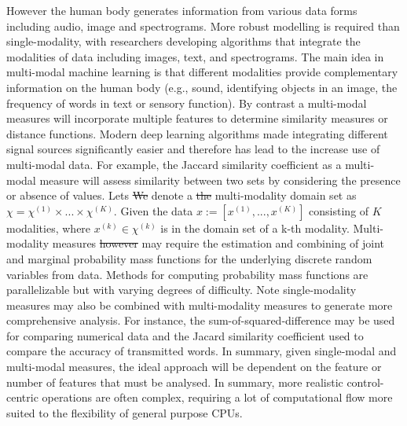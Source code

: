 \documentclass[10pt]{article}[draft]
\begin{document}
However the human body generates information from various data forms including audio, image and spectrograms.  More robust modelling is required than single-modality, with researchers developing algorithms that integrate the modalities of data including images, text, and spectrograms. The main idea in multi-modal machine learning is that different modalities provide complementary information on the human body (e.g., sound, identifying objects in an image, the frequency of words in text or sensory function).  By contrast a multi-modal measures will incorporate multiple  features to determine similarity measures or distance functions. Modern deep learning algorithms made integrating different signal sources significantly easier and therefore has lead to the increase use of multi-modal data.  For example, the Jaccard similarity coefficient as a multi-modal measure will assess similarity between two sets by considering the presence or absence of  values. Lets \st{We} denote a \st{the} multi-modality domain set as $\chi =  \chi^{(1)} \times ... \times \chi^{(K)} $. Given the data $x := [x^{(1)}, ... , x^{(K)}]$ consisting of $K$ modalities, where $x^{(k)}  \in \chi^{(k)}$ is in the domain set of a k-th modality. Multi-modality measures \st{however} may require the estimation and combining of joint and marginal probability mass functions for the underlying discrete random variables from data. Methods for computing probability mass functions  are parallelizable but with varying degrees of difficulty. Note single-modality measures may also be combined with multi-modality measures to generate more comprehensive analysis. For instance, the sum-of-squared-difference may be used for comparing numerical data and the Jacard similarity coefficient used to compare the accuracy of transmitted words. In summary, given single-modal and multi-modal measures, the ideal approach will be dependent on the feature or number of features that must be analysed. In summary, more realistic control-centric operations are often complex, requiring a lot of computational flow more suited to the flexibility of general purpose CPUs.
		
\end{document}
